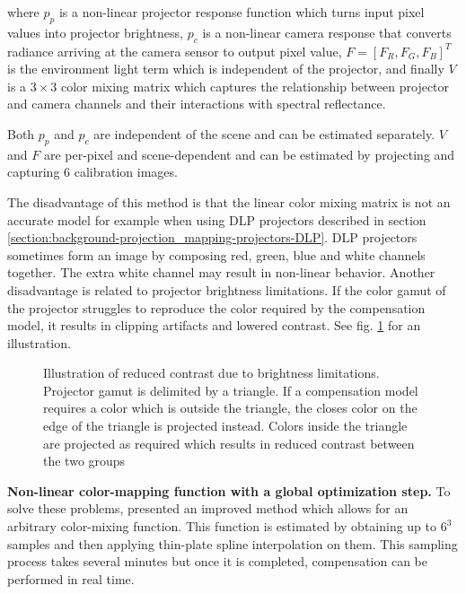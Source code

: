where \(p_p\) is a non-linear projector response function which turns input pixel values into projector brightness, \(p_c\) is a non-linear camera response that converts radiance arriving at the camera sensor to output pixel value, \(F = [F_R, F_G, F_B]^T\) is the environment light term which is independent of the projector, and finally \(V\) is a \(3 \times 3\) color mixing matrix which captures the relationship between projector and camera channels and their interactions with spectral reflectance.

Both \(p_p\) and \(p_c\) are independent of the scene and can be estimated separately. \(V\) and \(F\) are per-pixel and scene-dependent and can be estimated by projecting and capturing 6 calibration images.

The disadvantage of this method is that the linear color mixing matrix is not an accurate model for example when using DLP projectors described in section \ref{section:background-projection_mapping-projectors-DLP}. DLP projectors sometimes form an image by composing red, green, blue and white channels together. The extra white channel may result in non-linear behavior. Another disadvantage is related to projector brightness limitations. If the color gamut of the projector struggles to reproduce the color required by the compensation model, it results in clipping artifacts and lowered contrast. See fig. \ref{fig:background_clipping} for an illustration.

\begin{figure}[ht]
    \centering
    \def\svgwidth{0.6\textwidth}
    
    \caption{Illustration of reduced contrast due to brightness limitations. Projector gamut is delimited by a triangle. If a compensation model requires a color which is outside the triangle, the closes color on the edge of the triangle is projected instead. Colors inside the triangle are projected as required which results in reduced contrast between the two groups}
    \label{fig:background_clipping}
\end{figure}

\textbf{Non-linear color-mapping function with a global optimization step.} To solve these problems, \citet{Grundhofer2015} presented an improved method which allows for an arbitrary color-mixing function. This function is estimated by obtaining up to \(6^3\) samples and then applying thin-plate spline interpolation on them. This sampling process takes several minutes but once it is completed, compensation can be performed in real time.

